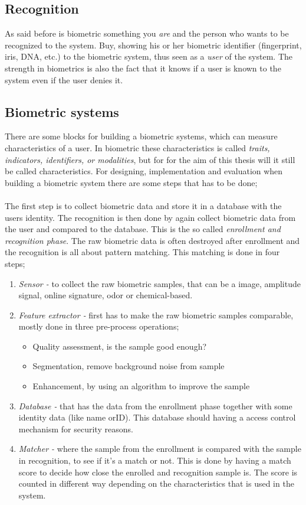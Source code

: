 \subsection{Recognition}
As said before is biometric something you \textit{are} and the person who wants to be recognized to the system. Buy, showing his or her biometric identifier (fingerprint, iris, DNA, etc.) to the biometric system, thus seen as a \textit{user} of the system. The strength in biometrics is also the fact that it knows if a user is known to the system even if the user denies it. \cite[ch.~1]{introbio}

\subsection{Biometric systems}
There are some blocks for building a biometric systems, which can measure characteristics of a user. In biometric these characteristics is called \textit{traits, indicators, identifiers, or modalities}, but for for the aim of this thesis will it still be called characteristics. For designing, implementation and evaluation when building a biometric system there are some steps that has to be done;\\
\\
The first step is to collect biometric data and store it in a database with the users identity. The recognition is then done by again collect biometric data from the user and compared to the database. This is the so called \textit{enrollment and recognition phase}. The raw biometric data is often destroyed after enrollment and the recognition is all about pattern matching. This matching is done in four steps;
\begin{enumerate}
	\item \textit{Sensor -} to collect the raw biometric samples, that can be a image, amplitude signal, online signature, odor or chemical-based.
	\item \textit{Feature extractor -} first has to make the raw biometric samples comparable, mostly done in three pre-process operations; 
	\begin{itemize}
    	\item Quality assessment, is the sample good enough?
		\item Segmentation, remove background noise from sample
		\item Enhancement, by using an algorithm to improve the sample 
    \end{itemize}
	\item \textit{Database -} that has the data from the enrollment phase together with some identity data (like name orID). This database should having a access control mechanism for security reasons.
	\item \textit{Matcher -} where the sample from the enrollment is compared with the sample in recognition, to see if it's a match or not. This is done by having a match score to decide how close the enrolled and recognition sample is. The score is counted in different way depending on the characteristics that is used in the system. 
\end{enumerate}
\cite[ch.~1]{introbio}


